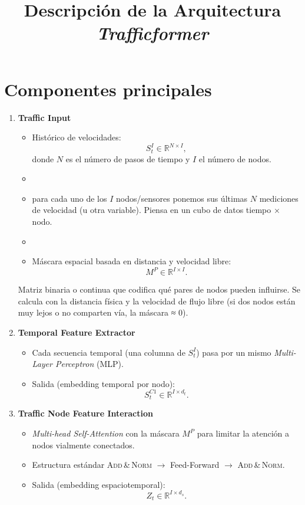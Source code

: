 \documentclass[11pt,a4paper]{article}
\begin{document}
	
	\title{Descripción de la Arquitectura \emph{Trafficformer}}
	\author{}
	\date{}
	\maketitle
	
	\section*{Componentes principales}
	
	\begin{enumerate}
		\item \textbf{Traffic Input}
		\begin{itemize}
			\item Histórico de velocidades:
			\[
			S_t^{I}\in\mathbb{R}^{N\times I},
			\]
			donde $N$ es el número de pasos de tiempo y $I$ el número de nodos.
			\item 
			\item para cada uno de los $I$ nodos/sensores ponemos sus últimas $N$ mediciones de velocidad (u otra variable). Piensa en un cubo de datos tiempo × nodo. 
			\item 
			\item Máscara espacial basada en distancia y velocidad libre:
			\[
			M^{P}\in\mathbb{R}^{I\times I}.
			\]
		\end{itemize}
		Matriz binaria o continua que codifica qué pares de nodos pueden influirse. Se calcula con la distancia física y la velocidad de flujo libre (si dos nodos están muy lejos o no comparten vía, la máscara ≈ 0). 
		
		\item \textbf{Temporal Feature Extractor}
		\begin{itemize}
			\item Cada secuencia temporal (una columna de $S_t^{I}$) pasa por un mismo
			\emph{Multi-Layer Perceptron} (MLP).
			\item Salida (embedding temporal por nodo):
			\[
			S_t^{C1}\in\mathbb{R}^{I\times d_t}.
			\]
		\end{itemize}
		
		\item \textbf{Traffic Node Feature Interaction}
		\begin{itemize}
			\item \emph{Multi-head Self-Attention} con la máscara $M^{P}$ para limitar la
			atención a nodos vialmente conectados.
			\item Estructura estándar \textsc{Add\,&\,Norm} $\rightarrow$ Feed-Forward
			$\rightarrow$ \textsc{Add\,&\,Norm}.
			\item Salida (embedding espaciotemporal):
			\[
			Z_t\in\mathbb{R}^{I\times d_s}.
			\]
		\end{itemize}
		

\end{enumerate}
\end{document}
